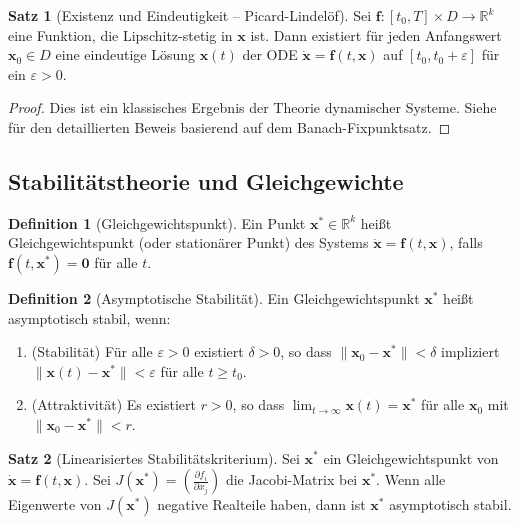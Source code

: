 ﻿\documentclass[a4paper,12pt]{article}
\theoremstyle{definition}
\newtheorem{definition}{Definition}
\newtheorem{satz}{Satz}
\begin{document}
\begin{satz}[Existenz und Eindeutigkeit -- Picard-Lindelöf]
Sei $\mathbf{f}: [t_0, T] \times D \to \mathbb{R}^k$ eine Funktion, die Lipschitz-stetig in $\mathbf{x}$ ist. Dann existiert für jeden Anfangswert $\mathbf{x}_0 \in D$ eine eindeutige Lösung $\mathbf{x}(t)$ der ODE $\dot{\mathbf{x}} = \mathbf{f}(t, \mathbf{x})$ auf $[t_0, t_0 + \varepsilon]$ für ein $\varepsilon > 0$.
\end{satz}

\begin{proof}
Dies ist ein klassisches Ergebnis der Theorie dynamischer Systeme. Siehe \cite{coddington1955theory} für den detaillierten Beweis basierend auf dem Banach-Fixpunktsatz.
\end{proof}

\subsection{Stabilitätstheorie und Gleichgewichte}

\begin{definition}[Gleichgewichtspunkt]
Ein Punkt $\mathbf{x}^* \in \mathbb{R}^k$ heißt Gleichgewichtspunkt (oder stationärer Punkt) des Systems $\dot{\mathbf{x}} = \mathbf{f}(t, \mathbf{x})$, falls $\mathbf{f}(t, \mathbf{x}^*) = \mathbf{0}$ für alle $t$.
\end{definition}

\begin{definition}[Asymptotische Stabilität]
Ein Gleichgewichtspunkt $\mathbf{x}^*$ heißt asymptotisch stabil, wenn:
\begin{enumerate}
\item (Stabilität) Für alle $\varepsilon > 0$ existiert $\delta > 0$, so dass $\|\mathbf{x}_0 - \mathbf{x}^*\| < \delta$ impliziert $\|\mathbf{x}(t) - \mathbf{x}^*\| < \varepsilon$ für alle $t \geq t_0$.
\item (Attraktivität) Es existiert $r > 0$, so dass $\lim_{t \to \infty} \mathbf{x}(t) = \mathbf{x}^*$ für alle $\mathbf{x}_0$ mit $\|\mathbf{x}_0 - \mathbf{x}^*\| < r$.
\end{enumerate}
\end{definition}

\begin{satz}[Linearisiertes Stabilitätskriterium]
Sei $\mathbf{x}^*$ ein Gleichgewichtspunkt von $\dot{\mathbf{x}} = \mathbf{f}(t, \mathbf{x})$. Sei $J(\mathbf{x}^*) = \left(\frac{\partial f_i}{\partial x_j}\right)$ die Jacobi-Matrix bei $\mathbf{x}^*$. Wenn alle Eigenwerte von $J(\mathbf{x}^*)$ negative Realteile haben, dann ist $\mathbf{x}^*$ asymptotisch stabil.
\end{satz}
\end{document}

